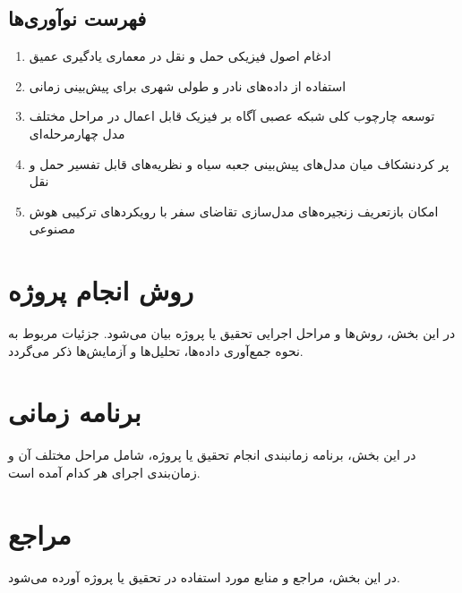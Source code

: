 \documentclass{titlepage}
\begin{document}
\subsection{فهرست نوآوری‌ها}
\begin{enumerate}
    \item ادغام اصول فیزیکی حمل و  نقل در معماری یادگیری عمیق
    \item استفاده از داده‌های نادر و طولی شهری برای پیش‌بینی زمانی
    \item توسعه چارچوب کلی شبکه عصبی آگاه بر فیزیک قابل اعمال در مراحل مختلف مدل چهارمرحله‌ای
    \item پر کردنشکاف میان مدل‌های پیش‌بینی جعبه سیاه و نظریه‌های قابل تفسیر حمل و نقل
    \item امکان بازتعریف زنجیره‌های مدل‌سازی تقاضای سفر با رویکردهای ترکیبی هوش مصنوعی
\end{enumerate}

\section{روش انجام پروژه}
در این بخش، روش‌ها و مراحل اجرایی تحقیق یا پروژه بیان می‌شود. جزئیات مربوط به نحوه جمع‌آوری داده‌ها، تحلیل‌ها و آزمایش‌ها ذکر می‌گردد.

\section{برنامه زمانی}
در این بخش، برنامه زمانبندی انجام تحقیق یا پروژه، شامل مراحل مختلف آن و زمان‌بندی اجرای هر کدام آمده است.

\section{مراجع}
در این بخش، مراجع و منابع مورد استفاده در تحقیق یا پروژه آورده می‌شود.
\end{document}
